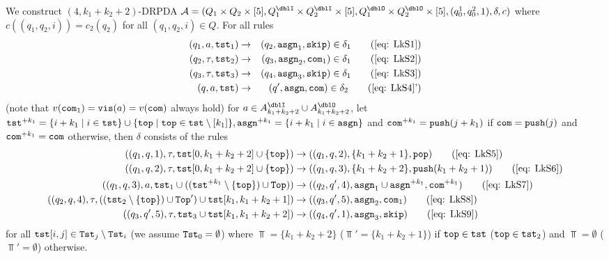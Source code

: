We construct $(4,k_1+k_2+2)$-DRPDA
$\calA=(Q_1\times Q_2\times[5], Q^\dblI_1\times Q^\dblI_2\times[5], Q^\dblO_1\times Q^\dblO_2\times[5], (q^1_0, q^2_0, 1), \delta, c)$
where $c((q_1,q_2,i))=c_2(q_2)$ for all $(q_1,q_2,i)\in Q$.
For all rules
\begin{align}
(q_1, a, \tst_1) &\to & (q_2,\asgn_1, \skip)\in\delta_1\tag{\ref{eq: LkS1}}\\
(q_2, \tau, \tst_2) &\to & (q_3,\asgn_2, \com_1)\in\delta_1\tag{\ref{eq: LkS2}}\\
(q_3, \tau, \tst_3) &\to & (q_4,\asgn_3, \skip)\in\delta_1\tag{\ref{eq: LkS3}}\\
(q, a, \tst) &\to & (q',\asgn, \com)\in\delta_2\tag{\ref{eq: LkS4}'}\\
\end{align}
(note that $v(\mathtt{com}_1)=\mathtt{vis}(a)=v(\mathtt{com})$ always hold) for $a\in A^\dblI_{k_1+k_2+2}\cup A^\dblO_{k_1+k_2+2}$,
let $\mathtt{tst}^{+ k_1}=\{i+k_1\mid i\in\mathtt{tst}\}\cup\{\mathtt{top}\mid\mathtt{top}\in\mathtt{tst}\setminus[k_1]\}, \mathtt{asgn}^{+ k_1}=\{i+k_1\mid i\in\mathtt{asgn}\}$ and $\mathtt{com}^{+ k_1} = \mathtt{push}(j+k_1)$ if $\mathtt{com}=\mathtt{push}(j)$ and $\mathtt{com}^{+ k_1} = \mathtt{com}$ otherwise, then $\delta$ consists of the rules
\begin{align}
((q_1, q, 1), \tau, \tst[0,k_1+k_2+2]\cup\{\top\}) &\to ((q_1, q, 2), \{k_1+k_2+1\}, \pop)\tag{\ref{eq: LkS5}}\\
((q_1, q, 2), \tau, \tst[0,k_1+k_2+2]\cup\{\top\}) &\to ((q_1, q, 3), \{k_1+k_2+2\}, \push(k_1+k_2+1))\tag{\ref{eq: LkS6}}\\
((q_1, q, 3), a,
\tst_1\cup ((\tst^{+ k_1}\setminus\{\top\})\cup\Top))
 &\to ((q_2, q', 4), \asgn_1\cup\asgn^{+ k_1}, \com^{+ k_1})\tag{\ref{eq: LkS7}}\\
((q_2, q, 4), \tau,((\tst_2\setminus\{\top\})\cup\Top')\cup\tst[k_1,k_1+k_2+1])
&\to ((q_3, q', 5), \asgn_2, \com_1)\tag{\ref{eq: LkS8}}\\
((q_3, q', 5), \tau, \tst_3\cup\tst[k_1,k_1+k_2+2]) &\to ((q_4, q', 1), \asgn_3, \skip)\tag{\ref{eq: LkS9}}\\
\end{align}
for all $\mathtt{tst}[i,j]\in\mathtt{Tst}_{j}\setminus\mathtt{Tst}_{i}$ (we assume $\mathtt{Tst}_0=\emptyset$) where
$\Top=\{k_1+k_2+2\}$ ($\Top'=\{k_1+k_2+1\}$) if $\mathtt{top}\in\mathtt{tst}$ ($\mathtt{top}\in\mathtt{tst}_2$) and $\Top=\emptyset$ ($\Top'=\emptyset$) otherwise.

